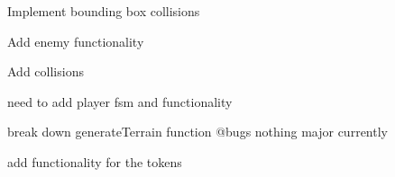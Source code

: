 
\begin{DoxyRefList}
\item[Class \mbox{\hyperlink{class_bounding_box}{Bounding\+Box}} ]\label{todo__todo000001}%
%
Implement bounding box collisions  
\item[Class \mbox{\hyperlink{class_enemy}{Enemy}} ]\label{todo__todo000002}%
%
Add enemy functionality 
\item[Class \mbox{\hyperlink{class_game_object}{Game\+Object}} ]\label{todo__todo000003}%
%
Add collisions 
\item[Class \mbox{\hyperlink{class_player}{Player}} ]\label{todo__todo000004}%
%
need to add player fsm and functionality 
\item[Class \mbox{\hyperlink{class_terrain}{Terrain}} ]\label{todo__todo000005}%
%
break down generate\+Terrain function @bugs nothing major currently 
\item[Class \mbox{\hyperlink{class_token}{Token}} ]\label{todo__todo000006}%
%
add functionality for the tokens
\end{DoxyRefList}